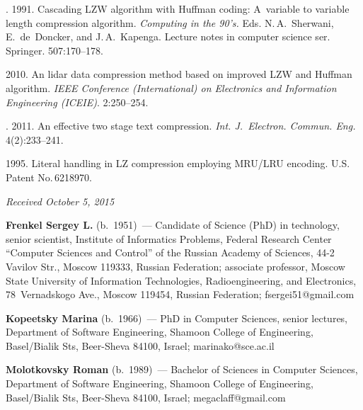 \begin{multicols}{2}
{{\begin{thebibliography}{99}
. 1991. Cascading LZW 
algorithm with Huffman coding: A~variable to variable length compression algorithm. 
\textit{Computing in the 90's.} Eds.  N.\,A.~Sherwani, E.~de~Doncker, and J.\,A.~Kapenga.
{Lecture notes in computer science ser.} Springer. 507:170--178.


  2010. 
An lidar data compression method based on improved LZW and Huffman algorithm.
\textit{IEEE  Conference (International) on Electronics and Information Engineering
 (ICEIE)}.  2:250--254. 

. 2011. 
An effective two stage text compression. \textit{Int. J.~Electron. 
Commun. Eng.} 4(2):233--241.

 1995. 
Literal handling in LZ compression employing MRU/LRU encoding. 
{U.S. Patent No.\,6218970}.
\end{thebibliography} } }

\end{multicols}

\vspace*{-7pt}

\hfill{\small\textit{Received October 5, 2015}}

\vspace*{-20pt}

\Contr

\noindent
\textbf{Frenkel Sergey L.} (b.\ 1951)~---
Candidate of Science (PhD) in technology, senior scientist, Institute of 
Informatics Problems, Federal Research Center ``Computer Sciences and Control'' 
of the Russian Academy of Sciences, 44-2 Vavilov Str., Moscow 119333, Russian Federation; 
associate professor, Moscow State University of Information
Technologies, Radioengineering, and Electronics,
78~Vernadskogo Ave., Moscow 119454, Russian Federation;
fsergei51@gmail.com

\vspace*{3pt}

\noindent
\textbf{Kopeetsky Marina} (b.\ 1966)~--- PhD in Computer Sciences, senior lectures, 
Department of Software Engineering, Shamoon College of Engineering, 
 Basel/Bialik Sts, Beer-Sheva 84100, Israel;  marinako@sce.ac.il 

\vspace*{3pt}

\noindent
\textbf{Molotkovsky Roman} (b.\ 1989)~---  Bachelor of  Sciences in Computer Sciences, 
Department of Software Engineering, Shamoon College of Engineering, 
Basel/Bialik Sts, Beer-Sheva 84100, Israel;
megaclaff@gmail.com


